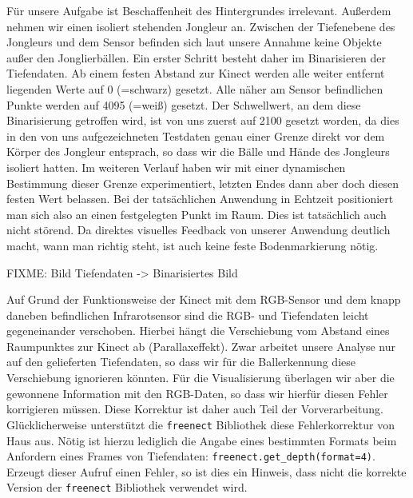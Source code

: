 \documentclass[12pt,a4paper,ngerman]{scrartcl}
\begin{document}
Für unsere Aufgabe ist Beschaffenheit des Hintergrundes irrelevant. Außerdem nehmen
wir einen isoliert stehenden Jongleur an. Zwischen der Tiefenebene des Jongleurs
und dem Sensor befinden sich laut unsere Annahme keine Objekte außer den
Jonglierbällen. Ein erster Schritt besteht daher im Binarisieren der Tiefendaten.
Ab einem festen Abstand zur Kinect werden alle weiter entfernt liegenden Werte auf 0
(=schwarz) gesetzt. Alle näher am Sensor befindlichen Punkte werden auf 4095 (=weiß)
gesetzt. Der Schwellwert, an dem diese Binarisierung getroffen wird, ist von uns
zuerst auf 2100 gesetzt worden, da dies in den von uns aufgezeichneten Testdaten
genau einer Grenze direkt vor dem Körper des Jongleur entsprach, so dass wir
die Bälle und Hände des Jongleurs isoliert hatten. Im weiteren Verlauf haben wir mit
einer dynamischen Bestimmung dieser Grenze experimentiert, letzten Endes dann aber
doch diesen festen Wert belassen. Bei der tatsächlichen Anwendung in Echtzeit
positioniert man sich also an einen festgelegten Punkt im Raum. Dies ist tatsächlich
auch nicht störend. Da direktes visuelles Feedback von unserer Anwendung deutlich
macht, wann man richtig steht, ist auch keine feste Bodenmarkierung nötig.

{\color{red}FIXME: Bild Tiefendaten -> Binarisiertes Bild}

Auf Grund der Funktionsweise der Kinect mit dem RGB-Sensor und dem knapp daneben
befindlichen Infrarotsensor sind die RGB- und Tiefendaten leicht gegeneinander
verschoben. Hierbei hängt die Verschiebung vom Abstand eines Raumpunktes zur Kinect
ab (Parallaxeffekt). Zwar arbeitet unsere Analyse nur auf den gelieferten
Tiefendaten, so dass wir für die Ballerkennung diese Verschiebung ignorieren
könnten. Für die Visualisierung überlagen wir aber die gewonnene Information mit
den RGB-Daten, so dass wir hierfür diesen Fehler korrigieren müssen. Diese
Korrektur ist daher auch Teil der Vorverarbeitung. Glücklicherweise unterstützt
die \lstinline{freenect} Bibliothek diese Fehlerkorrektur von Haus aus. Nötig
ist hierzu lediglich die Angabe eines bestimmten Formats beim Anfordern eines
Frames von Tiefendaten: \lstinline{freenect.get_depth(format=4)}.
Erzeugt dieser Aufruf einen Fehler, so ist dies ein Hinweis, dass nicht die korrekte
Version der \lstinline{freenect} Bibliothek verwendet wird.
\end{document}
